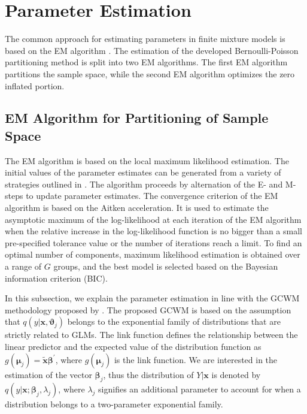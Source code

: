 \documentclass[11pt,letterpaper]{article}
\numberwithin{equation}{section}
\numberwithin{equation}{section}
\numberwithin{equation}{section}
\newcommand{\xTilda}{\tilde{\bm{x}}}
\begin{document}
\section{Parameter Estimation}\label{sec:estmeth}

The common approach for estimating parameters in finite mixture models is based on the EM algorithm \citep[see][for examples]{mcnicholas16a}.
The estimation of the developed Bernoulli-Poisson partitioning method is split into two EM algorithms. The first EM algorithm partitions the sample space, while the second EM algorithm optimizes the zero inflated portion.

\subsection{EM Algorithm for Partitioning of Sample Space}

The EM algorithm is based on the local  maximum likelihood estimation. %
The initial values of the parameter estimates can be generated from a variety of strategies outlined in \cite{initialPaperGrassiaRef}. %
 The algorithm proceeds by alternation of the E- and M-steps to update parameter estimates. %
%
The convergence criterion of the EM algorithm is based on the Aitken acceleration. It is used to estimate the asymptotic maximum of the log-likelihood at each iteration of the EM algorithm when the relative increase in the log-likelihood function is no bigger than a small pre-specified tolerance value or the number of iterations reach a limit. %
To find an optimal number of components, maximum likelihood estimation is obtained over a range of $G$ groups, and the best model is selected based on the Bayesian information criterion (BIC).   %

In this subsection, we explain the parameter estimation in line with the GCWM methodology proposed by \cite{Ingrassia+Punzo+Vittadini+Minotti:2015}. The proposed GCWM  is based on the assumption that $q(y|\bm{x},\bm{\vartheta}_j)$ belongs to the exponential family of distributions that are strictly related to GLMs. The link function defines the relationship between the linear predictor and the expected value of the distribution function as $g(\bm{\mu}_j)= \xTilda \bm{\beta}^{'}$, where $g(\bm{\mu}_j)$ is the link function. We are interested in the estimation of the vector $\bm {\beta}_j$, thus the distribution of $Y|\bm{x}$ is denoted by $q(y|\bm{x}; \bm{\beta}_j, \lambda_j)$, where $\lambda_j$ signifies an additional parameter to account for when a distribution belongs to a two-parameter exponential family.
\end{document}
